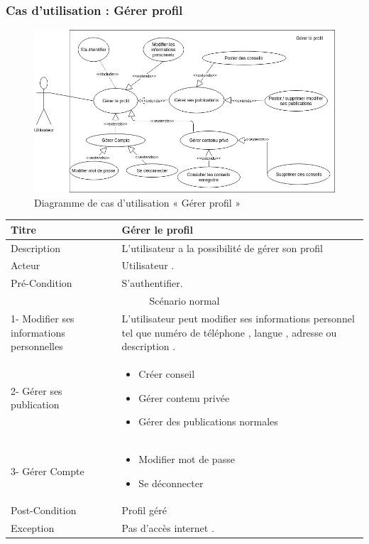 \documentclass[11pt,a4paper,oneside]{book}
\begin{document}
	\subsubsection{Cas d’utilisation : Gérer profil}
	\begin{figure}[H]
		\centering
		\includegraphics[width=1\textwidth]{Diagrammes/gerer_profil}
		\caption{Diagramme de cas d’utilisation « Gérer profil »}
		\label{fig:gererprofil}
	\end{figure}
	
	\begin{tabular}{ |p{3cm}|p{8cm}|  }
		
		\hline
		Titre& Gérer le profil \\
		\hline
		Description  & L’utilisateur a la possibilité de gérer son profil\\
		\hline
		Acteur&Utilisateur .\\
		\hline
		Pré-Condition &S’authentifier.
		\\
		\hline
		\multicolumn{2}{|c|}{Scénario normal} \\
		\hline
		1- Modifier ses informations personnelles & L’utilisateur peut modifier ses informations personnel tel que numéro de téléphone , langue , adresse ou description .\\
		
		2- Gérer ses publication & 
		\begin{itemize} 
			\item Créer conseil 
			\item Gérer contenu privée
			\item Gérer des publications normales 
			\end {itemize} \\
			3- Gérer Compte&
			\begin{itemize}
				\item Modifier mot de passe 
				\item Se déconnecter
			\end{itemize}\\
			\hline
			Post-Condition& Profil géré\\
			\hline
			Exception&  Pas d’accès internet .\\
			\hline
		\end{tabular}
		
\end{document}
